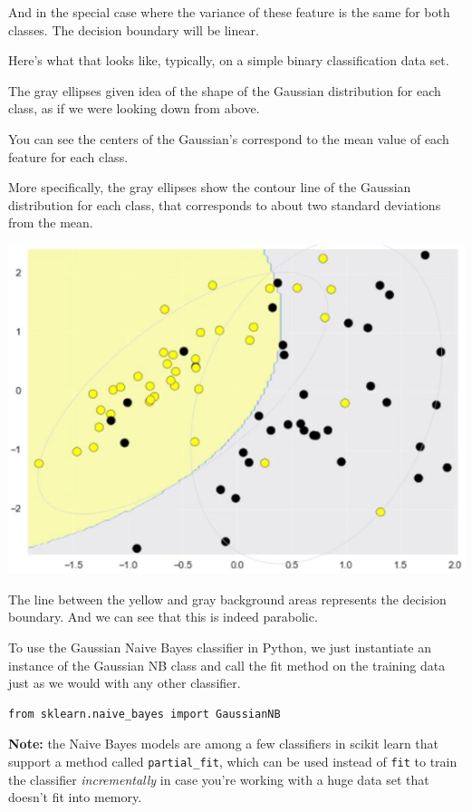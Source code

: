 \begin{multicols}{2}
And in the special case where the variance of these feature is the same for both classes. The decision boundary will be linear. 

Here's what that looks like, typically, on a simple binary classification data set. 

The gray ellipses given idea of the shape of the Gaussian distribution for each class, as if we were looking down from above. 

You can see the centers of the Gaussian's correspond to the mean value of each feature for each class. 

More specifically, the gray ellipses show the contour line of the Gaussian distribution for each class, that corresponds to about two standard deviations from the mean. 

\begin{center}
	\includegraphics[width=\linewidth]{img/Gaussian-Naive-Bayes-Classifier-1.png} 
\end{center}


The line between the yellow and gray background areas represents the decision boundary. And we can see that this is indeed parabolic. 

To use the Gaussian Naive Bayes classifier in Python, 
we just instantiate an instance of the Gaussian NB class and call the fit method on the training data just as we would with any other classifier. 

\begin{verbatim}
from sklearn.naive_bayes import GaussianNB
\end{verbatim}

\textbf{Note:} the Naive Bayes models are among a few classifiers in scikit learn that support a method called \texttt{partial_fit},  which can be used instead of \texttt{fit} to train the classifier \emph{incrementally} in case you're working with a huge data set that doesn't fit into memory. 


\end{multicols}

